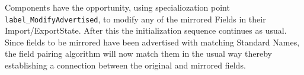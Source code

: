 Components have the opportunity, using specialiozation point {\tt label\_ModifyAdvertised}, to modify any of the mirrored Fields in their Import/ExportState. After this the initialization sequence continues as usual.  Since fields to be mirrored have been advertised with matching Standard Names, the field pairing algorithm will now match them in the usual way thereby establishing a connection between the original and mirrored fields.
